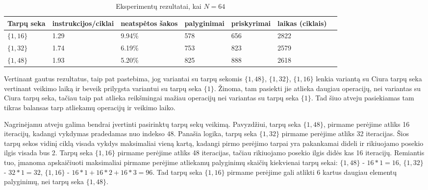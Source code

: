 \documentclass{VUMIFInfBakalaurinis}
\begin{document}
\begin{table}[H]
  \caption{Eksperimentų rezultatai, kai $N = 64$}
  \label{perf_results2_64}
  \centering
  \begin{tabular}{@{}lllllll@{}}
  Tarpų seka             & instrukcijos/ciklai     & neatspėtos šakos  & palyginimai       & priskyrimai      & laikas (ciklais) \\ \midrule
  $\{1, 16 \}$            & 1.29                    & 9.94\%            & 578               & 656              & 2822                  \\
  $\{1, 32 \}$            & 1.74                    & 6.19\%            & 753               & 823              & 2579                  \\
  $\{1, 48 \}$            & 1.93                    & 5.20\%            & 825               & 888              & 2618                  \\ \bottomrule
  \end{tabular}
\end{table}

Vertinant gautus rezultatus, taip pat pastebima, jog variantai su tarpų sekomis $\{1, 48 \}$, $\{1, 32 \}$, $\{1, 16 \}$ lenkia variantą
su Ciura tarpų seka vertinant veikimo laiką ir beveik prilygsta variantui su tarpų seka $\{1\}$.
Žinoma, tam pasiekti jie atlieka daugiau operacijų, nei variantas su Ciura tarpų seka, tačiau taip pat atlieka reikšmingai mažiau operacijų nei variantas su tarpų seka $\{1\}$.
Tad šiuo atveju pasiekiamas tam tikras balansas tarp atliekamų operacijų ir veikimo laiko.

Nagrinėjamu atveju galima bendrai įvertinti pasirinktų tarpų sekų veikimą.
Pavyzdžiui, tarpų seka $\{ 1, 48 \}$, pirmame perėjime atliks 16 iteracijų, kadangi vykdymas pradedamas nuo indekso $48$.
Panašia logika, tarpų seka $\{1, 32 \}$ pirmame perėjime atliks 32 iteracijas.
Šios tarpų sekos vidinį ciklą visada vykdys maksimaliai vieną kartą, kadangi pirmo perėjimo tarpai yra pakankamai dideli ir rikiuojamo posekio ilgis visada bus 2.
Tarpų seka $\{1, 16 \}$ pirmame perėjime atliks 48 iteracijas, tačiau rikiuojamo posekio ilgis didės kas 16 iteracijų.
Remiantis tuo, įmanoma apskaičiuoti maksimaliai pirmame perėjime atliekamų palyginimų skaičių kiekvienai tarpų sekai:
$\{1, 48 \}$ - $16 * 1 = 16$, $\{1, 32 \}$ - $32 * 1 = 32$, $\{1, 16 \}$ - $16 * 1 + 16 * 2 + 16 * 3 = 96$.
Tad tarpų seka $\{1, 16 \}$ pirmame perėjime gali atlikti 6 kartus daugiau elementų palyginimų, nei tarpų seka $\{1, 48 \}$.
\end{document}
